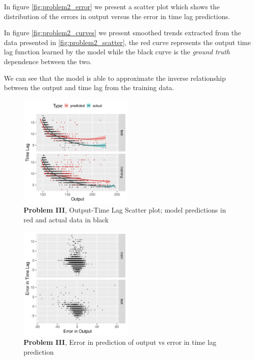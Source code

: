 \documentclass[runningheads]{llncs}
\begin{document}
In figure \ref{fig:problem2_error} we present a scatter plot which shows the distribution of the 
errors in output versus the error in time lag predictions.

In figure \ref{fig:problem2_curves} we present smoothed trends extracted from the data presented in 
\ref{fig:problem2_scatter}, the red curve represents the output time lag function learned by the model 
while the black curve is the \emph{ground truth} dependence between the two. 

We can see that the model is able to approximate the inverse relationship between the output and 
time lag from the training data.

\begin{figure}[h]
\vspace{.3in}
\centerline{\includegraphics[width=0.5\textwidth]{figures/exp3_scatter_v_tl.png}}
\vspace{.3in}
\caption{\textbf{Problem III}, Output-Time Lag Scatter plot; model predictions in red and actual data in black}
\label{fig:problem3_scatter}
\end{figure}

\begin{figure}[h]
\vspace{.3in}
\centerline{\includegraphics[width=0.5\textwidth]{figures/exp3_scatter_errors.png}}
\vspace{.3in}
\caption{\textbf{Problem III}, Error in prediction of output vs error in time lag prediction}
\label{fig:problem3_error}
\end{figure}
\end{document}
